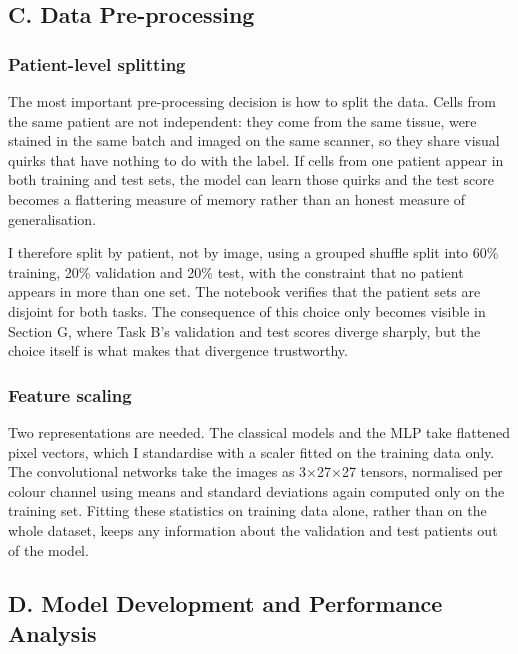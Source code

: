 \documentclass[
  11pt,
]{article}
\begin{document}
\hypertarget{c.-data-pre-processing}{%
\subsection{C. Data Pre-processing}\label{c.-data-pre-processing}}

\hypertarget{patient-level-splitting}{%
\subsubsection{Patient-level splitting}\label{patient-level-splitting}}

The most important pre-processing decision is how to split the data.
Cells from the same patient are not independent: they come from the same
tissue, were stained in the same batch and imaged on the same scanner,
so they share visual quirks that have nothing to do with the label. If
cells from one patient appear in both training and test sets, the model
can learn those quirks and the test score becomes a flattering measure
of memory rather than an honest measure of generalisation.

I therefore split by patient, not by image, using a grouped shuffle
split into 60\% training, 20\% validation and 20\% test, with the
constraint that no patient appears in more than one set. The notebook
verifies that the patient sets are disjoint for both tasks. The
consequence of this choice only becomes visible in Section G, where Task
B's validation and test scores diverge sharply, but the choice itself is
what makes that divergence trustworthy.

\hypertarget{feature-scaling}{%
\subsubsection{Feature scaling}\label{feature-scaling}}

Two representations are needed. The classical models and the MLP take
flattened pixel vectors, which I standardise with a scaler fitted on the
training data only. The convolutional networks take the images as
3×27×27 tensors, normalised per colour channel using means and standard
deviations again computed only on the training set. Fitting these
statistics on training data alone, rather than on the whole dataset,
keeps any information about the validation and test patients out of the
model.

\hypertarget{d.-model-development-and-performance-analysis}{%
\subsection{D. Model Development and Performance
Analysis}\label{d.-model-development-and-performance-analysis}}
\end{document}
